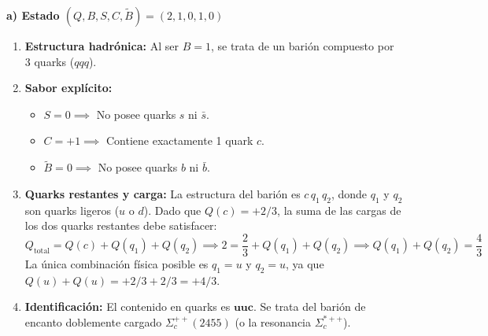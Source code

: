 \begin{problema}
\textbf{a) Estado $(Q, B, S, C, \tilde{B}) = (2, 1, 0, 1, 0)$}
\begin{enumerate}[label=\arabic*.]
    \item \textbf{Estructura hadrónica:} Al ser $B = 1$, se trata de un barión compuesto por 3 quarks ($qqq$).
    \item \textbf{Sabor explícito:}
    \begin{itemize}
        \item $S = 0 \implies$ No posee quarks $s$ ni $\bar{s}$.
        \item $C = +1 \implies$ Contiene exactamente 1 quark $c$.
        \item $\tilde{B} = 0 \implies$ No posee quarks $b$ ni $\bar{b}$.
    \end{itemize}
    \item \textbf{Quarks restantes y carga:} La estructura del barión es $c \, q_1 \, q_2$, donde $q_1$ y $q_2$ son quarks ligeros ($u$ o $d$). Dado que $Q(c) = +2/3$, la suma de las cargas de los dos quarks restantes debe satisfacer:
    \begin{equation*}
        Q_{\text{total}} = Q(c) + Q(q_1) + Q(q_2) \implies 2 = \frac{2}{3} + Q(q_1) + Q(q_2) \implies Q(q_1) + Q(q_2) = \frac{4}{3}
    \end{equation*}
    La única combinación física posible es $q_1 = u$ y $q_2 = u$, ya que $Q(u) + Q(u) = +2/3 + 2/3 = +4/3$.
    \item \textbf{Identificación:} El contenido en quarks es $\mathbf{uuc}$. Se trata del barión de encanto doblemente cargado \textbf{$\Sigma_c^{++}(2455)$} (o la resonancia $\Sigma_c^{*++}$).
\end{enumerate}


\end{problema}
